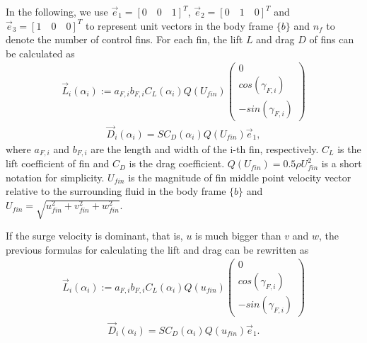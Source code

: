 In the following, we use $\vec{e}_{1}=[0\quad 0 \quad 1]^{T}$, $\vec{e}_{2}=[0 \quad 1\quad 0]^{T}$ and $\vec{e}_{3}=[1\quad 0 \quad 0]^{T}$ to represent unit vectors in the body frame $\lbrace b \rbrace$ and $n_{f}$ to denote the number of control fins. 
For each fin, the lift $L$ and drag $D$ of fins can be calculated as
\begin{align}
\vec{L}_{ i }(\alpha _{ i }):=a_{F,i}b_{F,i}{ C }_{ L }(\alpha _{ i })Q(U_{fin})\begin{pmatrix} 0 \\ cos({ \gamma  }_{ F,i }) \\ -sin({ \gamma  }_{ F,i }) \end{pmatrix}
\end{align}
\begin{align}
\vec{D}_{ i }(\alpha _{ i })=S{ C }_{ D }(\alpha _{ i })Q(U_{fin})\vec{e}_{1},
\end{align}
where $a_{F,i}$ and $b_{F,i}$ are the length and width of the i-th fin, respectively. $C_{L}$ is the lift coefficient of fin and $C_{D}$ is the drag coefficient. 
$Q(U_{fin})=0.5\rho U_{fin}^{2}$ is a short notation for simplicity.  $U_{fin}$ is the magnitude of fin middle point velocity vector relative to the surrounding fluid in the body frame $\lbrace b \rbrace$ and $U_{fin}=\sqrt{u_{fin}^{2}+v_{fin}^{2}+w_{fin}^{2}}$.

If the surge velocity is dominant, that is, $u$ is much bigger than $v$ and $w$, the previous formulas for calculating the lift and drag can be rewritten as
\begin{align}
\vec{L}_{ i }(\alpha _{ i }):=a_{F,i}b_{F,i}{ C }_{ L }(\alpha _{ i })Q(u_{fin})\begin{pmatrix} 0 \\ cos({ \gamma}_{ F,i}) \\ -sin({ \gamma  }_{ F,i }) \end{pmatrix}
\end{align}
\begin{align}
\vec{D}_{ i }(\alpha _{ i })=S{ C }_{ D }(\alpha _{ i })Q(u_{fin})\vec{e}_{1}.
\end{align}

